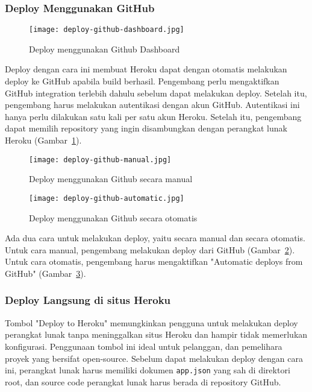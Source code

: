 \subsubsection{Deploy Menggunakan GitHub}
\begin{figure}[H]
	\centering  
	\texttt{[image: deploy-github-dashboard.jpg]}  
	\caption[Deploy menggunakan Github Dashboard]{Deploy menggunakan Github Dashboard} 
	\label{fig:deploy-github-dashboard} 
\end{figure}
Deploy dengan cara ini membuat Heroku dapat dengan otomatis melakukan deploy ke GitHub apabila build berhasil. Pengembang perlu mengaktifkan GitHub integration terlebih dahulu sebelum dapat melakukan deploy. Setelah itu, pengembang harus melakukan autentikasi dengan akun GitHub. Autentikasi ini hanya perlu dilakukan satu kali per satu akun Heroku. Setelah itu, pengembang dapat memilih repository yang ingin disambungkan dengan perangkat lunak Heroku (Gambar~\ref{fig:deploy-github-dashboard}).

\begin{figure}[H]
	\centering  
	\texttt{[image: deploy-github-manual.jpg]}  
	\caption[Deploy menggunakan Github secara manual]{Deploy menggunakan Github secara manual} 
	\label{fig:deploy-github-manual} 
\end{figure}
\begin{figure}[H]
	\centering  
	\texttt{[image: deploy-github-automatic.jpg]}  
	\caption[Deploy menggunakan Github secara otomatis]{Deploy menggunakan Github secara otomatis} 
	\label{fig:deploy-github-automatic} 
\end{figure}
Ada dua cara untuk melakukan deploy, yaitu secara manual dan secara otomatis. Untuk cara manual, pengembang melakukan deploy dari GitHub (Gambar~\ref{fig:deploy-github-manual}). Untuk cara otomatis, pengembang harus mengaktifkan "Automatic deploys from GitHub" (Gambar~\ref{fig:deploy-github-automatic}).

\subsubsection{Deploy Langsung di situs Heroku}
Tombol "Deploy to Heroku" memungkinkan pengguna untuk melakukan deploy perangkat lunak tanpa meninggalkan situs Heroku dan hampir tidak memerlukan konfigurasi. Penggunaan tombol ini ideal untuk pelanggan, dan pemelihara proyek yang bersifat open-source. Sebelum dapat melakukan deploy dengan cara ini, perangkat lunak harus memiliki dokumen \texttt{app.json} yang sah di direktori root, dan source code perangkat lunak harus berada di repository GitHub.

